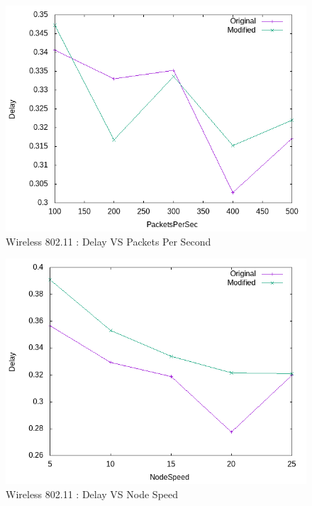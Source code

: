     \begin{figure}[!h] 
        \centering
        \includegraphics[width=.9\textwidth]{Pictures/Wireless802.11Mobile/Combined/DelayVSPacketsPerSec.png}
         \caption{Wireless 802.11 : Delay VS Packets Per Second}
    \end{figure}
    
    \begin{figure}[!h] 
        \centering
        \includegraphics[width=.9\textwidth]{Pictures/Wireless802.11Mobile/Combined/DelayVSNodeSpeed.png}
         \caption{Wireless 802.11 : Delay VS Node Speed}
    \end{figure}
    
\newpage
